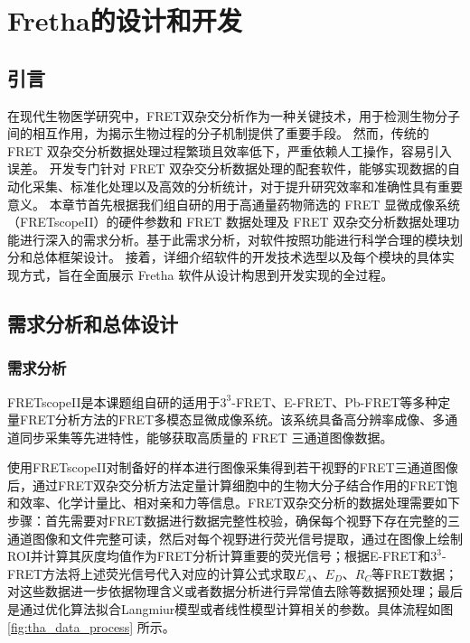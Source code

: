 \chapter{Fretha的设计和开发}

\section{引言}

\ifshowtext
在现代生物医学研究中，FRET双杂交分析作为一种关键技术，用于检测生物分子间的相互作用，为揭示生物过程的分子机制提供了重要手段。
然而，传统的 FRET 双杂交分析数据处理过程繁琐且效率低下，严重依赖人工操作，容易引入误差。
开发专门针对 FRET 双杂交分析数据处理的配套软件，能够实现数据的自动化采集、标准化处理以及高效的分析统计，对于提升研究效率和准确性具有重要意义。
本章节首先根据我们组自研的用于高通量药物筛选的 FRET 显微成像系统（FRETscopeII）的硬件参数和 FRET 数据处理及 FRET 双杂交分析数据处理功能进行深入的需求分析。基于此需求分析，对软件按照功能进行科学合理的模块划分和总体框架设计。
接着，详细介绍软件的开发技术选型以及每个模块的具体实现方式，旨在全面展示 Fretha 软件从设计构思到开发实现的全过程。
\fi

\section{需求分析和总体设计}

\subsection{需求分析}

\ifshowtext
FRETscopeII是本课题组自研的适用于$3^3$-FRET、E-FRET、Pb-FRET等多种定量FRET分析方法的FRET多模态显微成像系统。该系统具备高分辨率成像、多通道同步采集等先进特性，能够获取高质量的 FRET 三通道图像数据。

使用FRETscopeII对制备好的样本进行图像采集得到若干视野的FRET三通道图像后，通过FRET双杂交分析方法定量计算细胞中的生物大分子结合作用的FRET饱和效率、化学计量比、相对亲和力等信息。FRET双杂交分析的数据处理需要如下步骤：首先需要对FRET数据进行数据完整性校验，确保每个视野下存在完整的三通道图像和文件完整可读，然后对每个视野进行荧光信号提取，通过在图像上绘制ROI并计算其灰度均值作为FRET分析计算重要的荧光信号；根据E-FRET和$3^3$-FRET方法将上述荧光信号代入对应的计算公式求取$E_A$、$E_D$、$R_C$等FRET数据；对这些数据进一步依据物理含义或者数据分析进行异常值去除等数据预处理；最后是通过优化算法拟合Langmiur模型或者线性模型计算相关的参数。具体流程如图 \ref{fig:tha_data_process} 所示。

